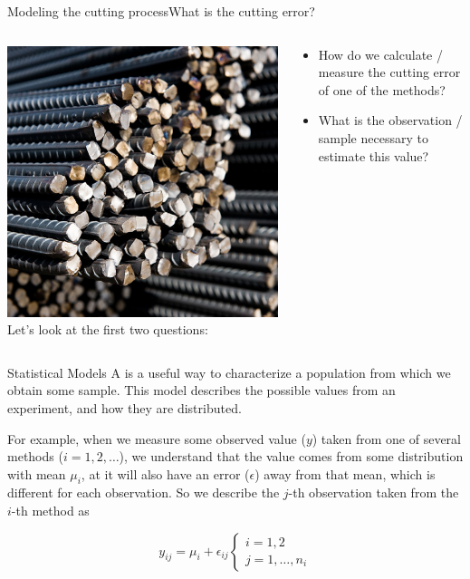 \begin{frame}[t]{Modeling the cutting process}{What is the cutting error?}
  \begin{columns}[T]
    \includegraphics[width=\textwidth]{../img/steelrods}
    Let's look at the first two questions:
    \begin{block}{}
    {\smaller
    \begin{itemize}
      \item How do we calculate / measure the cutting error of one of the methods?
      \item What is the observation / sample necessary to estimate this value?
    \end{itemize}}
    \end{block}\bigskip
  \end{columns}
\end{frame}

\begin{frame}{Statistical Models}
  A  is a useful way to characterize a population from which we obtain some sample. This model describes the possible values from an experiment, and how they are distributed.\bigskip

  For example, when we measure some observed value ($y$) taken from one of several methods ($i = 1, 2,\ldots$), we understand that the value comes from some distribution with mean $\mu_i$, at it will also have an error ($\epsilon$) away from that mean, which is different for each observation. So we describe the $j$-th observation taken from the $i$-th method as

  \begin{equation*}
    y_{ij} = \mu_i + \epsilon_{ij}\begin{cases}i=1,2\\j=1,\ldots,n_i\end{cases}
  \end{equation*}
\end{frame}


